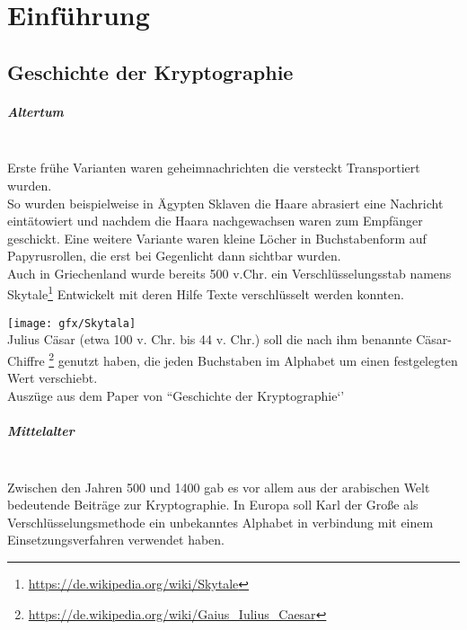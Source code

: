 
\chapter{Einführung} %

\label{ch:introduction} %


\section{Geschichte der Kryptographie}


\paragraph{Altertum}
\hfill\\
Erste frühe Varianten waren geheimnachrichten die versteckt Transportiert wurden.\\
So wurden beispielweise in Ägypten Sklaven die Haare abrasiert eine Nachricht eintätowiert und nachdem die Haara nachgewachsen waren zum Empfänger geschickt.
Eine weitere Variante waren kleine Löcher in Buchstabenform auf Papyrusrollen, die erst bei Gegenlicht dann sichtbar wurden.
\\ Auch in Griechenland wurde bereits 500 v.Chr. ein Verschlüsselungsstab namens Skytale\footnote{\url{https://de.wikipedia.org/wiki/Skytale}} Entwickelt mit deren Hilfe Texte verschlüsselt werden konnten.

\texttt{[image: gfx/Skytala]}%
\hfill
\\ Julius Cäsar (etwa 100 v. Chr. bis 44 v. Chr.) soll die nach ihm benannte Cäsar-Chiffre \footnote{\url{https://de.wikipedia.org/wiki/Gaius_Iulius_Caesar}} genutzt haben, die jeden Buchstaben im Alphabet um einen festgelegten Wert verschiebt.
\\Auszüge aus dem Paper von \citeauthor{huetter:geschichte} ``Geschichte der Kryptographie`'\citep{huetter:geschichte}

\paragraph{Mittelalter}
\hfill\\
\citeauthor{al-kadi}Zwischen den Jahren 500 und 1400 gab es vor allem aus der arabischen Welt bedeutende Beiträge zur Kryptographie.\citep{al-kadi}
In Europa soll Karl der Große als Verschlüsselungsmethode ein unbekanntes Alphabet in verbindung mit einem Einsetzungsverfahren verwendet haben.
\newpage

